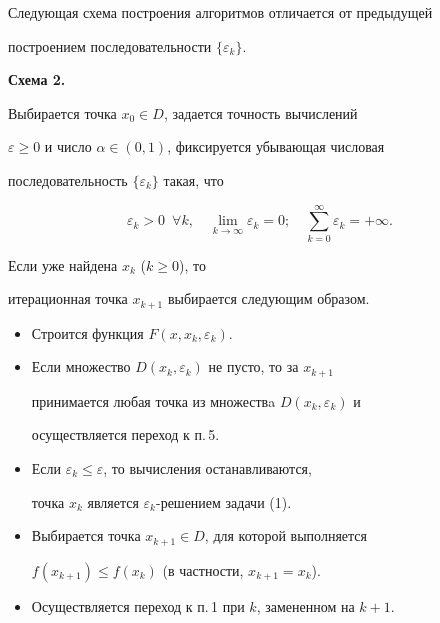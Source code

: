 Следующая схема построения алгоритмов отличается от предыдущей


построением последовательности $\{\varepsilon_k\}$.


\medskip





{\bf Схема 2.}


Выбирается точка $x_0\in D$, задается точность вычислений


$\varepsilon\ge0$ и число $\alpha\in (0,1)$, фиксируется убывающая числовая


последовательность $\{\varepsilon_k\}$ такая, что


\begin{equation}


\varepsilon_k>0\ \; \forall k,


\quad \lim_{k\to\infty} \varepsilon_k=0;


\quad \sum_{k=0}^{\infty}\varepsilon_k=+\infty.


\end{equation}





Если уже найдена $x_k$ ($k\geq0$), то


итерационная точка $x_{k+1}$ выбирается следующим образом.


\begin{itemize}


\item[1.] Строится функция $F(x,x_k,\varepsilon_k)$.


\item[2.] Если множество $D(x_k,\varepsilon_k)$ не пусто, то за $x_{k+1}$


принимается любая точка из множествa $D(x_k,\varepsilon_k)$ и


осуществляется переход к п.\,5.


\item[3.] Если $\varepsilon_k\le \varepsilon$, то вычисления останавливаются,


точка $x_k$ является $\varepsilon_k$-решением задачи (1).


\item[4.] Выбирается точка $x_{k+1}\in D$, для которой выполняется


$f(x_{k+1})\le f(x_k)$ (в частности, $x_{k+1}=x_k$). 


\item[5.] Осуществляется переход к п.\,1 при $k$, замененном на $k+1$.


\end{itemize}





